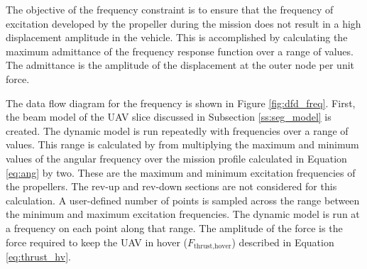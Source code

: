 \documentclass[doublespace,nopageskip]{VTthesis}
\begin{document}
		
		The objective of the frequency constraint is to ensure that the frequency of excitation developed by the propeller during the mission does not result in a high displacement amplitude in the vehicle. This is accomplished by calculating the maximum admittance of the frequency response function over a range of values. The admittance is the amplitude of the displacement at the outer node per unit force.
		
		The data flow diagram for the frequency is shown in Figure \ref{fig:dfd_freq}. First, the beam model of the UAV slice discussed in Subsection \ref{ss:seg_model} is created. The dynamic model is run repeatedly with frequencies over a range of values. This range is calculated by from multiplying the maximum and minimum values of the angular frequency over the mission profile calculated in Equation \ref{eq:ang} by two. These are the maximum and minimum excitation frequencies of the propellers. The rev-up and rev-down sections are not considered for this calculation. A user-defined number of points is sampled across the range between the minimum and maximum excitation frequencies. The dynamic model is run at a frequency on each point along that range. The amplitude of the force is the force required to keep the UAV in hover ($F_\text{thrust,hover}$) described in Equation \ref{eq:thrust_hv}.
		
\end{document}
